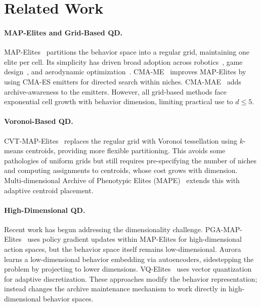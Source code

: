 \section{Related Work}
\label{sec:related_work}

\paragraph{MAP-Elites and Grid-Based QD.}
MAP-Elites~\cite{mouret2015illuminating} partitions the behavior space into a regular grid, maintaining one elite per cell.
Its simplicity has driven broad adoption across robotics~\cite{cully2015robots}, game design~\cite{gravina2019procedural}, and aerodynamic optimization~\cite{gaier2018data}.
CMA-ME~\cite{fontaine2020covariance} improves MAP-Elites by using CMA-ES emitters for directed search within niches.
CMA-MAE~\cite{fontaine2022differentiable} adds archive-awareness to the emitters.
However, all grid-based methods face exponential cell growth with behavior dimension, limiting practical use to $d \leq 5$.

\paragraph{Voronoi-Based QD.}
CVT-MAP-Elites~\cite{vassiliades2018using} replaces the regular grid with Voronoi tessellation using $k$-means centroids, providing more flexible partitioning.
This avoids some pathologies of uniform grids but still requires pre-specifying the number of niches and computing assignments to centroids, whose cost grows with dimension.
Multi-dimensional Archive of Phenotypic Elites (MAPE)~\cite{vassiliades2018using} extends this with adaptive centroid placement.

\paragraph{High-Dimensional QD.}
Recent work has begun addressing the dimensionality challenge.
PGA-MAP-Elites~\cite{nilsson2021policy} uses policy gradient updates within MAP-Elites for high-dimensional action spaces, but the behavior space itself remains low-dimensional.
Aurora~\cite{paolo2021sparse} learns a low-dimensional behavior embedding via autoencoders, sidestepping the problem by projecting to lower dimensions.
VQ-Elites~\cite{duarte2024vq} uses vector quantization for adaptive discretization.
These approaches modify the behavior representation; \mmr instead changes the archive maintenance mechanism to work directly in high-dimensional behavior spaces.

